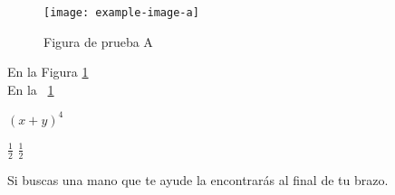 \documentclass[a4paper,11pt]{article}
\newcommand{\figref}[1]{\figurename~\ref{#1}}
\newcommand{\plusbinomial}[3][2]{(#2 + #3)^#1}
\let\oldfrac=\frac
\renewcommand{\frac}[2]{\ensuremath{\oldfrac{#1}{#2}}}
\let\oldquote=\quote
\let\oldendquote=\endquote
\renewenvironment{quote}
    {\vspace{10pt}\leftbar\vspace*{-6pt}\oldquote}
    {\oldendquote\endleftbar\vspace{10pt}}
\begin{document}
  \begin{figure}
    \centering
    \texttt{[image: example-image-a]} 
    \caption{Figura de prueba A}
    \label{figura}
  \end{figure}
  
  En la Figura \ref{figura} \\
  En la \figref{figura}
  
  $\plusbinomial[4]{x}{y}$
  
  \frac{1}{2}
  $\oldfrac{1}{2}$
  
  \begin{quote}
   Si buscas una mano que te ayude la encontrarás al final de tu brazo.
  \end{quote}
  
\end{document}

